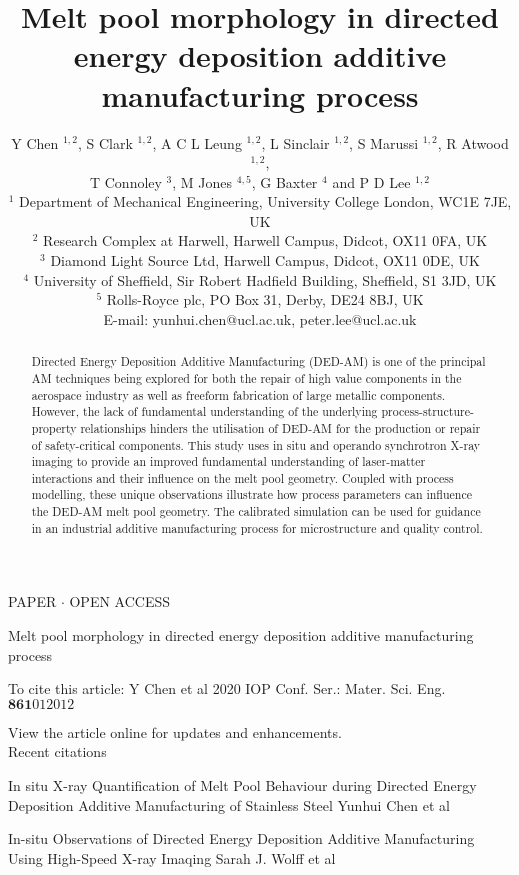 \documentclass[10pt]{article}
\title{Melt pool morphology in directed energy deposition additive manufacturing process }
\author{Y Chen $^{1,2}$, S Clark ${ }^{1,2}$, A C L Leung ${ }^{1,2}$, L Sinclair ${ }^{1,2}$, S Marussi ${ }^{1,2}$, R Atwood ${ }^{1,2}$,\\
T Connoley $^{3}$, M Jones ${ }^{4,5}$, G Baxter ${ }^{4}$ and P D Lee ${ }^{1,2}$\\
${ }^{1}$ Department of Mechanical Engineering, University College London, WC1E 7JE, UK\\
${ }^{2}$ Research Complex at Harwell, Harwell Campus, Didcot, OX11 0FA, UK\\
${ }^{3}$ Diamond Light Source Ltd, Harwell Campus, Didcot, OX11 0DE, UK\\
${ }^{4}$ University of Sheffield, Sir Robert Hadfield Building, Sheffield, S1 3JD, UK\\
${ }^{5}$ Rolls-Royce plc, PO Box 31, Derby, DE24 8BJ, UK\\
E-mail: yunhui.chen@ucl.ac.uk, peter.lee@ucl.ac.uk}
\date{}
\begin{document}
\maketitle
PAPER $\cdot$ OPEN ACCESS

Melt pool morphology in directed energy deposition additive manufacturing process

To cite this article: Y Chen et al 2020 IOP Conf. Ser.: Mater. Sci. Eng. $\mathbf{8 6 1} 012012$

View the article online for updates and enhancements.\\
Recent citations

In situ X-ray Quantification of Melt Pool Behaviour during Directed Energy Deposition Additive Manufacturing of Stainless Steel Yunhui Chen et al

In-situ Observations of Directed Energy Deposition Additive Manufacturing Using High-Speed X-ray Imaqing Sarah J. Wolff et al



\begin{abstract}
Directed Energy Deposition Additive Manufacturing (DED-AM) is one of the principal AM techniques being explored for both the repair of high value components in the aerospace industry as well as freeform fabrication of large metallic components. However, the lack of fundamental understanding of the underlying process-structure-property relationships hinders the utilisation of DED-AM for the production or repair of safety-critical components. This study uses in situ and operando synchrotron X-ray imaging to provide an improved fundamental understanding of laser-matter interactions and their influence on the melt pool geometry. Coupled with process modelling, these unique observations illustrate how process parameters can influence the DED-AM melt pool geometry. The calibrated simulation can be used for guidance in an industrial additive manufacturing process for microstructure and quality control.
\end{abstract}
\end{document}
